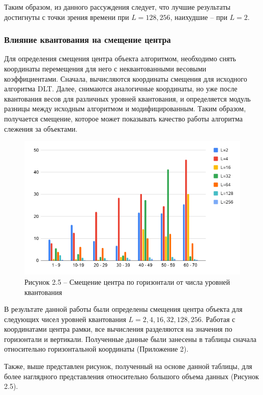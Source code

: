 Таким образом, из данного рассуждения следует, что лучшие результаты достигнуты с точки зрения времени при $L = 128, 256$, наихудшие -- при $L=2$.

\subsubsection{Влияние квантования на смещение центра}

Для определения смещения центра объекта алгоритмом, необходимо снять координаты перемещения для него с неквантованными весовыми коэффициентами. Сначала, вычисляются координаты смещения для исходного алгоритма DLT. Далее, снимаются аналогичные координаты, но уже после квантования весов для различных уровней квантования, и определяется модуль разницы между исходным алгоритмом и модифицированным. Таким образом, получается смещение, которое может показывать качество работы алгоритма слежения за объектами.

\begin{figure}[h!]
    \centering
    \includegraphics[width = 14 cm]{tests/img/diag_x.png}
    \caption*{Рисунок 2.5 -- Смещение центра по горизонтали от числа уровней квантования}
    \label{fig:my_label}
\end{figure}

В результате данной работы были определены смещения центра объекта для следующих чисел уровней квантования $L = 2, 4, 16, 32, 128, 256$. Работая с координатами центра рамки, все вычисления разделяются  на значения по горизонтали и вертикали. Полученные данные были занесены в таблицы сначала относительно горизонтальной координаты (Приложение 2).

Также, выше представлен рисунок, полученный на основе данной таблицы, для более наглядного представления относительно большого объема данных (Рисунок 2.5).


